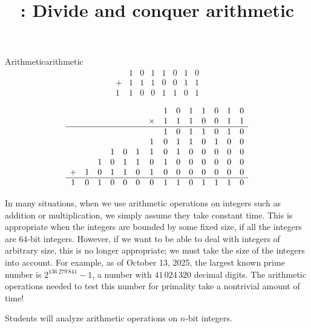 \documentclass{tufte-handout}
\title{\thecourse: Divide and conquer arithmetic}
\date{}
\begin{document}
\maketitle


\begin{model*}{Arithmetic}{arithmetic}
  \[
    \begin{array}{cccccccc}
         & 1 & 0 & 1 & 1 & 0 & 1 & 0 \\
       + & 1 & 1 & 1 & 0 & 0 & 1 & 1 \\
      \hline
       1 & 1 & 0 & 0 & 1 & 1 & 0 & 1
    \end{array}
  \] \vspace{0.3in}

  \[
    \begin{array}{cccccccccccccc}
  & & & & & & &1&0&1&1&0&1&0 \\
  & & & & & &\times&1&1&1&0&0&1&1 \\
  \hline
  & & & & & & &1&0&1&1&0&1&0 \\
  & & & & & &1&0&1&1&0&1&0&0 \\
  & & &1&0&1&1&0&1&0&0&0&0&0 \\
  & &1&0&1&1&0&1&0&0&0&0&0&0 \\
 +&1&0&1&1&0&1&0&0&0&0&0&0&0 \\
 \hline
 1&0&1&0&0&0&0&1&1&0&1&1&1&0
    \end{array}
  \] \vspace{0.3in}
\end{model*}

In many situations, when we use arithmetic operations on integers such
as addition or multiplication, we simply assume they take constant
time.  This is appropriate when the integers are bounded by some fixed
size, \eg if all the integers are $64$-bit integers.  However, if we
want to be able to deal with integers of arbitrary size, this is no
longer appropriate; we must take the size of the integers into
account.  For example, as of October 13, 2025, the largest
known prime number is $2^{136\,279\,841} - 1$, a number with
$41\,024\,320$ decimal digits.  The arithmetic operations needed to
test this number for primality take a nontrivial amount of time!

\begin{objective}
  Students will analyze arithmetic operations on $n$-bit integers.
\end{objective}
\end{document}
